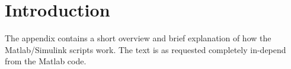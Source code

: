 \section{Introduction}
The appendix contains a short overview and brief explanation of how the Matlab/Simulink scripts work. The text is as requested completely in-depend from the Matlab code. 